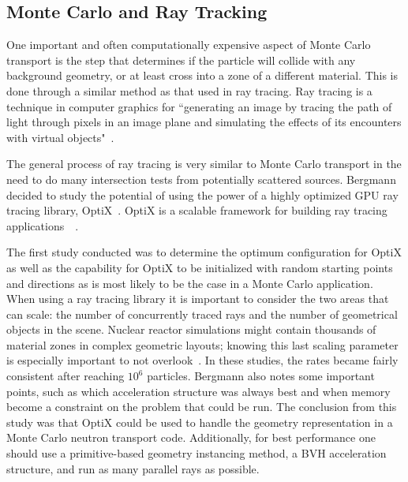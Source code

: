 \subsection{\textbf{Monte Carlo and Ray Tracking}}

One important and often computationally expensive aspect of Monte Carlo transport is the step that determines if the particle will collide with any background geometry, or at least cross into a zone of a different material.
%
This is done through a similar method as that used in ray tracing.
%
Ray tracing is a technique in computer graphics for ``generating an image by tracing the path of light through pixels in an image plane and simulating the effects of its encounters with virtual objects"~\cite{wikipediaRayTracing}.

The general process of ray tracing is very similar to Monte Carlo transport in the need to do many intersection tests from potentially scattered sources.
%
Bergmann decided to study the potential of using the power of a highly optimized GPU ray tracing library, OptiX~\cite{2014development}.
%
OptiX is a scalable framework for building ray tracing applications~\cite{optixProgrammingGuide}~\cite{parker2010optix}.

%
The first study conducted was to determine the optimum configuration for OptiX as well as the capability for OptiX to be initialized with random starting points and directions as is most likely to be the case in a Monte Carlo application.
%
When using a ray tracing library it is important to consider the two areas that can scale: the number of concurrently traced rays and the number of geometrical objects in the scene.
%
Nuclear reactor simulations might contain thousands of material zones in complex geometric layouts; knowing this last scaling parameter is especially important to not overlook~\cite{2014development}.
%
In these studies, the rates became fairly consistent after reaching $10^6$ particles.
Bergmann also notes some important points, such as which acceleration structure was always best and when memory become a constraint on the problem that could be run.
 The conclusion from this study was that OptiX could be used to handle the geometry representation in a Monte Carlo neutron transport code.
 Additionally, for best performance one should use a primitive-based geometry instancing method, a BVH acceleration structure, and run as many parallel rays as possible.
%

